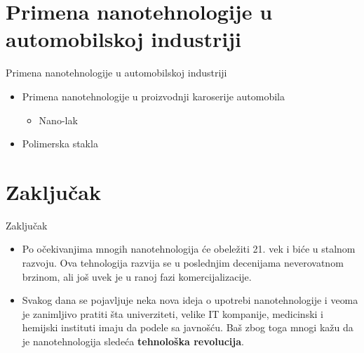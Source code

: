 \documentclass{beamer}
\begin{document}
\section{Primena nanotehnologije u automobilskoj industriji}
\begin{frame}{Primena nanotehnologije u automobilskoj industriji}
\begin{center}
\begin{itemize}
\item Primena nanotehnologije u proizvodnji karoserije automobila
\begin{itemize}
\item Nano-lak

\end{itemize}
\item Polimerska stakla
\end{itemize}
\end{center}
\end{frame}

\section{Zaključak}
\begin{frame}{Zaključak}
\begin{itemize}
\item Po očekivanjima mnogih nanotehnologija će obeležiti 21. vek i biće u stalnom
razvoju. Ova tehnologija razvija se u poslednjim decenijama neverovatnom brzinom, ali još uvek
je u ranoj fazi komercijalizacije.
\item Svakog dana se pojavljuje neka nova ideja o upotrebi nanotehnologije i veoma je
zanimljivo pratiti šta univerziteti, velike IT kompanije, medicinski i hemijski instituti imaju da
podele sa javnošću. Baš zbog toga mnogi kažu da je nanotehnologija sledeća \textbf{tehnološka
revolucija}.
\end{itemize}
\end{frame}
\end{document}
